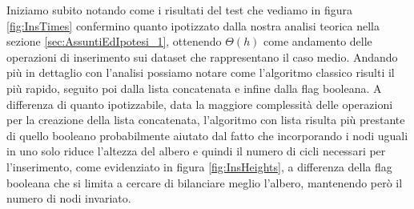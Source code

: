 Iniziamo subito notando come i risultati del test che vediamo in figura \ref{fig:InsTimes} confermino quanto ipotizzato dalla nostra analisi teorica nella sezione \ref{sec:AssuntiEdIpotesi_1},
ottenendo $\Theta(h)$ come andamento delle operazioni di inserimento sui dataset che rappresentano il caso medio.
Andando più in dettaglio con l'analisi possiamo notare come l'algoritmo classico risulti il più rapido, seguito poi dalla lista concatenata e infine dalla flag booleana. 
A differenza di quanto ipotizzabile, data la maggiore complessità delle operazioni per la creazione della lista concatenata, l'algoritmo con lista risulta più prestante di quello booleano probabilmente
aiutato dal fatto che incorporando i nodi uguali in uno solo riduce l'altezza del albero e quindi il numero di cicli necessari per l'inserimento, come evidenziato in figura \ref{fig:InsHeights},
a differenza della flag booleana che si limita a cercare di bilanciare meglio l'albero, mantenendo però il numero di nodi invariato.

